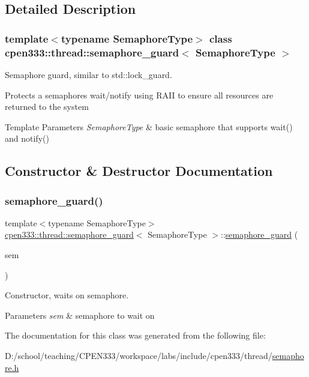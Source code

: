 \subsection{Detailed Description}
\subsubsection*{template$<$typename Semaphore\+Type$>$\newline
class cpen333\+::thread\+::semaphore\+\_\+guard$<$ Semaphore\+Type $>$}

Semaphore guard, similar to std\+::lock\+\_\+guard. 

Protects a semaphore\textquotesingle{}s wait/notify using R\+A\+II to ensure all resources are returned to the system 
\begin{DoxyTemplParams}{Template Parameters}
{\em Semaphore\+Type} & basic semaphore that supports wait() and notify() \\
\hline
\end{DoxyTemplParams}


\subsection{Constructor \& Destructor Documentation}
\mbox{\label{classcpen333_1_1thread_1_1semaphore__guard_a0704e609f573247313eb66722b6ff145}} 
\subsubsection{\texorpdfstring{semaphore\+\_\+guard()}{semaphore\_guard()}}
{\footnotesize\ttfamily template$<$typename Semaphore\+Type$>$ \\
\hyperlink{classcpen333_1_1thread_1_1semaphore__guard}{cpen333\+::thread\+::semaphore\+\_\+guard}$<$ Semaphore\+Type $>$\+::\hyperlink{classcpen333_1_1thread_1_1semaphore__guard}{semaphore\+\_\+guard} (\begin{DoxyParamCaption}\item[{Semaphore\+Type \&}]{sem }\end{DoxyParamCaption})\hspace{0.3cm}{\ttfamily [inline]}}



Constructor, waits on semaphore. 


\begin{DoxyParams}{Parameters}
{\em sem} & semaphore to wait on \\
\hline
\end{DoxyParams}


The documentation for this class was generated from the following file\+:\begin{DoxyCompactItemize}
\item 
D\+:/school/teaching/\+C\+P\+E\+N333/workspace/labs/include/cpen333/thread/\hyperlink{thread_2semaphore_8h}{semaphore.\+h}\end{DoxyCompactItemize}
